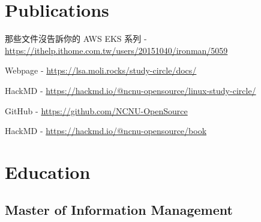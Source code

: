 \documentclass[]{deedy-resume-openfont}
\begin{document}
\begin{minipage}[t]{1\textwidth}
\section{Publications}

\null\hfill{}
\begin{tightemize}
    \item 那些文件沒告訴你的 AWS EKS 系列 - \href{https://ithelp.ithome.com.tw/users/20151040/ironman/5059}{https://ithelp.ithome.com.tw/users/20151040/ironman/5059}
\end{tightemize}
\sectionsep

\null\hfill{}
\begin{tightemize}
    \item Webpage - \href{https://lsa.moli.rocks/study-circle/docs/}{https://lsa.moli.rocks/study-circle/docs/}
    \item HackMD - \href{https://hackmd.io/@ncnu-opensource/linux-study-circle/}{https://hackmd.io/@ncnu-opensource/linux-study-circle/}
\end{tightemize}
\sectionsep

\null\hfill{}
\begin{tightemize}
    \item GitHub - \href{https://github.com/NCNU-OpenSource}{https://github.com/NCNU-OpenSource}
    \item HackMD - \href{https://hackmd.io/@ncnu-opensource/book}{https://hackmd.io/@ncnu-opensource/book}
\end{tightemize}

\section{Education}

\subsection{Master of Information Management}
\null\hfill{}


\end{minipage}
\end{document}
